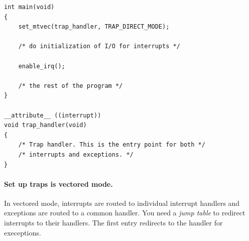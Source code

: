 \documentclass[12pt]{article}
\begin{document}
\begin{lstlisting}[]
int main(void)
{
    set_mtvec(trap_handler, TRAP_DIRECT_MODE);

    /* do initialization of I/O for interrupts */

    enable_irq();

    /* the rest of the program */
}

__attribute__ ((interrupt))
void trap_handler(void)
{
    /* Trap handler. This is the entry point for both */
    /* interrupts and exceptions. */
}
\end{lstlisting}

\paragraph*{Set up traps is vectored mode.} In vectored mode, interrupts are routed to individual interrupt handlers and exceptions are routed to a common handler. You need a \textsl{jump table} to redirect interrupts to their handlers. The first entry redirects to the handler for execeptions.
\end{document}
